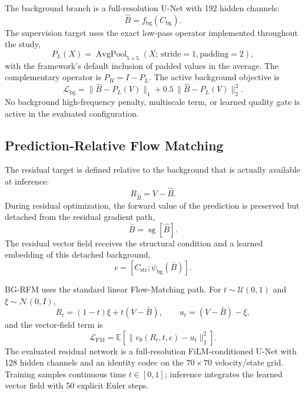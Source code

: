 The background branch is a full-resolution U-Net \citep{ronneberger2015unet} with 192 hidden channels:
\begin{equation}
\hat B=f_{\mathrm{bg}}(C_{\mathrm{bg}}).
\end{equation}
The supervision target uses the exact low-pass operator implemented throughout the study,
\begin{equation}
P_L(X)=\operatorname{AvgPool}_{5\times5}(X;\,\text{stride}=1,\text{padding}=2),
\end{equation}
with the framework's default inclusion of padded values in the average. The complementary operator is $P_H=I-P_L$. The active background objective is
\begin{equation}
\mathcal L_{\mathrm{bg}}
=
\|\hat B-P_L(V)\|_1
+0.5\,\|\hat B-P_L(V)\|_2^2.
\label{eq:bg-loss-final}
\end{equation}
No background high-frequency penalty, multiscale term, or learned quality gate is active in the evaluated configuration.

\subsection{Prediction-Relative Flow Matching}

The residual target is defined relative to the background that is actually available at inference:
\begin{equation}
R_{\hat B}=V-\hat B.
\label{eq:rs_pred_residual}
\end{equation}
During residual optimization, the forward value of the prediction is preserved but detached from the residual gradient path,
\begin{equation}
\bar B=\operatorname{sg}[\hat B].
\end{equation}
The residual vector field receives the structural condition and a learned embedding of this detached background,
\begin{equation}
c=[C_{\mathrm{str}};\psi_{\mathrm{bg}}(\bar B)].
\end{equation}

BG-RFM uses the standard linear Flow-Matching path. For $t\sim\mathcal U(0,1)$ and $\xi\sim\mathcal N(0,I)$,
\begin{equation}
R_t=(1-t)\xi+t(V-\bar B),
\qquad
u_t=(V-\bar B)-\xi ,
\end{equation}
and the vector-field term is
\begin{equation}
\mathcal L_{\mathrm{FM}}
=
\mathbb E\left[
\|v_\theta(R_t,t,c)-u_t\|_2^2
\right].
\end{equation}
The evaluated residual network is a full-resolution FiLM-conditioned U-Net \citep{perez2018film} with 128 hidden channels and an identity codec on the $70\times70$ velocity/state grid. Training samples continuous time $t\in[0,1]$; inference integrates the learned vector field with 50 explicit Euler steps.

